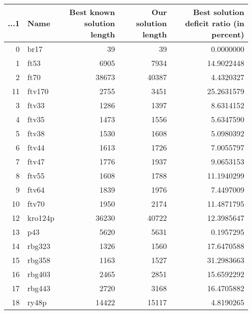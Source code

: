 \begin{table}
\centering
\begin{tabular}{r|l|r|r|r}
\hline
...1 & Name & Best known solution length & Our solution length & Best solution deficit ratio (in percent)\\
\hline
0 & br17 & 39 & 39 & 0.0000000\\
\hline
1 & ft53 & 6905 & 7934 & 14.9022448\\
\hline
2 & ft70 & 38673 & 40387 & 4.4320327\\
\hline
11 & ftv170 & 2755 & 3451 & 25.2631579\\
\hline
3 & ftv33 & 1286 & 1397 & 8.6314152\\
\hline
4 & ftv35 & 1473 & 1556 & 5.6347590\\
\hline
5 & ftv38 & 1530 & 1608 & 5.0980392\\
\hline
6 & ftv44 & 1613 & 1726 & 7.0055797\\
\hline
7 & ftv47 & 1776 & 1937 & 9.0653153\\
\hline
8 & ftv55 & 1608 & 1788 & 11.1940299\\
\hline
9 & ftv64 & 1839 & 1976 & 7.4497009\\
\hline
10 & ftv70 & 1950 & 2174 & 11.4871795\\
\hline
12 & kro124p & 36230 & 40722 & 12.3985647\\
\hline
13 & p43 & 5620 & 5631 & 0.1957295\\
\hline
14 & rbg323 & 1326 & 1560 & 17.6470588\\
\hline
15 & rbg358 & 1163 & 1527 & 31.2983663\\
\hline
16 & rbg403 & 2465 & 2851 & 15.6592292\\
\hline
17 & rbg443 & 2720 & 3168 & 16.4705882\\
\hline
18 & ry48p & 14422 & 15117 & 4.8190265\\
\hline
\end{tabular}
\end{table}
